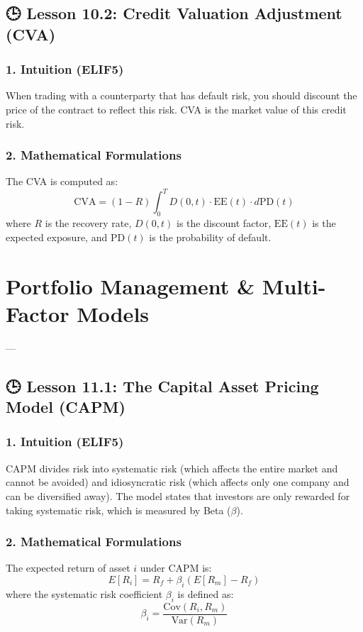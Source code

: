 \documentclass[11pt,oneside]{book}
\begin{document}
\section{🕒 Lesson 10.2: Credit Valuation Adjustment (CVA)}

\subsection{1. Intuition (ELIF5)}
When trading with a counterparty that has default risk, you should discount the price of the contract to reflect this risk. CVA is the market value of this credit risk.

\subsection{2. Mathematical Formulations}
The CVA is computed as:
$$\text{CVA} = (1 - R) \int_0^T D(0, t) \cdot \text{EE}(t) \cdot d\text{PD}(t)$$
where $R$ is the recovery rate, $D(0,t)$ is the discount factor, $\text{EE}(t)$ is the expected exposure, and $\text{PD}(t)$ is the probability of default.


\newpage

\chapter{Portfolio Management & Multi-Factor Models}

---

\section{🕒 Lesson 11.1: The Capital Asset Pricing Model (CAPM)}

\subsection{1. Intuition (ELIF5)}
CAPM divides risk into systematic risk (which affects the entire market and cannot be avoided) and idiosyncratic risk (which affects only one company and can be diversified away). The model states that investors are only rewarded for taking systematic risk, which is measured by Beta ($\beta$).

\subsection{2. Mathematical Formulations}
The expected return of asset $i$ under CAPM is:
$$E[R_i] = R_f + \beta_i (E[R_m] - R_f)$$
where the systematic risk coefficient $\beta_i$ is defined as:
$$\beta_i = \frac{\text{Cov}(R_i, R_m)}{\text{Var}(R_m)}$$
\end{document}
